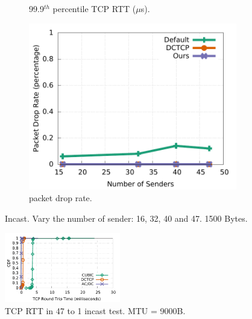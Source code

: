 \begin{figure}[t]
\begin{subfigure}[b]{0.33\textwidth}
                \caption{99.9$^{th}$ percentile TCP RTT ($\mu$s).}
                \label{incast_15k_999th_sockperf}
        \end{subfigure}
        \begin{subfigure}[b]{0.33\textwidth}
                \centering
                \includegraphics[width=\textwidth]{figures/incast/plots15k/15k_incast_droprate_vary_sender.pdf}
                \caption{packet drop rate.}
                \label{incast_15k_droprate}
        \end{subfigure}
        \caption{Incast. Vary the number of sender: 16, 32, 40 and 47. 1500 Bytes.}
        \label{incast_15k_sockperf_droprate}
\end{figure}
\fi

\begin{figure}[t]
        \centering
  \includegraphics[width=0.45\textwidth]{figures/incast/47to1/incast_47to1_test_sockperf.pdf}
        \caption{TCP RTT in 47 to 1 incast test. MTU = 9000B.}
        \label{sockperf_incast_47to1}
\end{figure}

